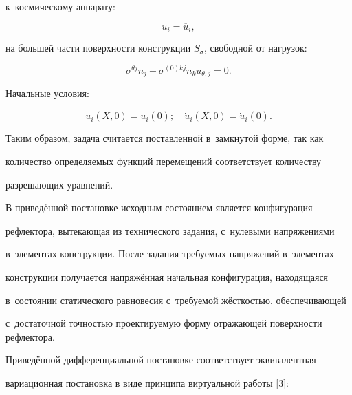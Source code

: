 к~космическому аппарату: 

\begin{equation*}

\label{belkov:eq4}

u_i={\overline u}_i,

\end{equation*}

на большей части поверхности конструкции $S_{\sigma }$, свободной от нагрузок:

\begin{equation*}

\label{belkov:eq5}

\sigma ^{\theta j}n_j +\sigma ^{(0)kj}n_k u_{\theta,j} =0.

\end{equation*}



Начальные условия: 

\begin{equation*}

\label{belkov:eq6}

u_i(X, 0)=\overline{u}_i(0);\quad \dot {u}_i(X, 0)=\overline{\dot{u}}_i (0).

\end{equation*}



Таким образом, задача считается поставленной в~замкнутой форме, так как 

количество определяемых функций перемещений соответствует количеству 

разрешающих уравнений.



В приведённой постановке исходным состоянием является конфигурация 

рефлектора, вытекающая из технического задания, с~нулевыми напряжениями 

в~элементах конструкции. После задания требуемых напряжений в~элементах 

конструкции получается  напряжённая начальная конфигурация, находящаяся 

в~состоянии статического равновесия с~требуемой  жёсткостью, обеспечивающей 

с~достаточной точностью проектируемую форму отражающей поверхности рефлектора.



Приведённой дифференциальной постановке соответствует эквивалентная 

вариационная постановка в виде принципа виртуальной работы [3]:

